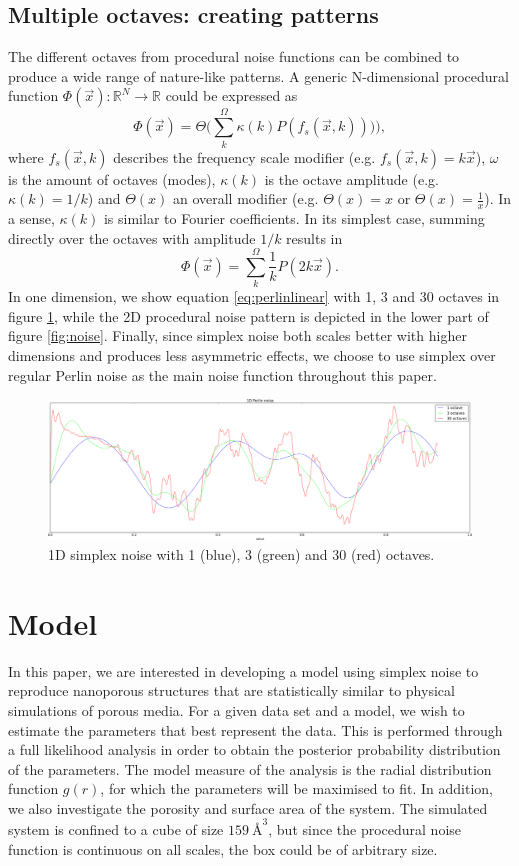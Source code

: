 \documentclass[aps,pre,twocolumn,letterpaper,floatfix,showpacs]{revtex4}
\begin{document}
\subsection{Multiple octaves: creating patterns}
\label{sec:octaves}
The different octaves from procedural noise functions can be combined
to produce a wide range of nature-like patterns. A generic
N-dimensional procedural function $\Phi(\vec x): \mathbb R^N \to
\mathbb R$ could be expressed as
\begin{equation}
\label{eq:procedural}
 \Phi(\vec x) = \Theta \Big(\sum_k^\Omega \kappa (k) P(  f_s (\vec x,k) )) \Big),
 \end{equation}
where $f_s(\vec x,k)$ describes the frequency scale modifier (e.g. $f_s(\vec x,k) =
k\vec x$), $\omega$ is the amount of octaves (modes), $\kappa(k)$ is the octave amplitude (e.g. $\kappa(k) = 1/k$)
and $\Theta(x)$ an overall modifier (e.g. $\Theta(x) = x$ or
$\Theta(x) = \frac{1}{x}$). In a sense, $\kappa(k)$ is similar to Fourier coefficients. 
In its simplest case, summing directly over the octaves with amplitude $1/k$ results in 
\begin{equation}
\label{eq:perlinlinear}
 \Phi(\vec x) = \sum_k^\Omega \frac{1}{k} P( 2k\vec x).
\end{equation}
In one dimension, we show equation \ref{eq:perlinlinear} with 1, 3 and 30 octaves in figure \ref{fig:1dperlin}, while the 2D procedural noise pattern is depicted in the lower
part of figure \ref{fig:noise}. Finally, since simplex noise both scales better with higher dimensions and produces less asymmetric effects, we choose to use simplex over regular Perlin noise as the main noise function throughout this paper.

\begin{figure}
\includegraphics[width=.5\textwidth]{1d_perlin.png}
\caption{1D simplex noise with 1 (blue), 3 (green) and 30 (red) octaves. }
\label{fig:1dperlin}
\end{figure}


\section{Model}
In this paper, we are interested in developing a model using simplex noise to reproduce nanoporous structures that are statistically similar to physical simulations of porous media.
For a given data set and a model, we wish to estimate the parameters that best represent the data. 
This is performed through a full likelihood analysis in order to obtain the posterior probability distribution of the parameters. 
The model measure of the analysis is the radial distribution function $g(r)$, for which the parameters will be maximised to fit. 
In addition, we also investigate the porosity and surface area of the system. 
The simulated system is confined to a cube of size $\SI{159} {\angstrom}^3$, but since the procedural noise function is continuous on all scales, the box could be of arbitrary size. 
\end{document}

